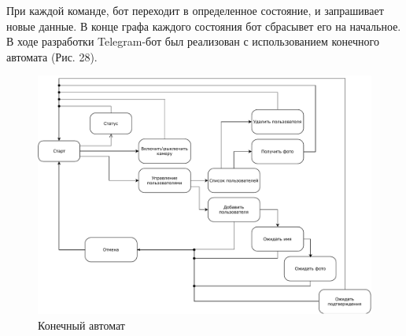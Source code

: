 При каждой команде, бот переходит в определенное состояние, и запрашивает новые
данные. В конце графа каждого состояния бот сбрасывет его на начальное. В ходе
разработки Telegram-бот был реализован с использованием конечного автомата
(Рис. 28).


\begin{figure}[h!]
  \centering
  \setlength{\fboxsep}{5pt}
  \includegraphics[width=1\textwidth]{data-visualisation/state-machine}
  \vspace*{6pt}
  \caption{Конечный автомат}\label{fig:state-machine}
\end{figure}
